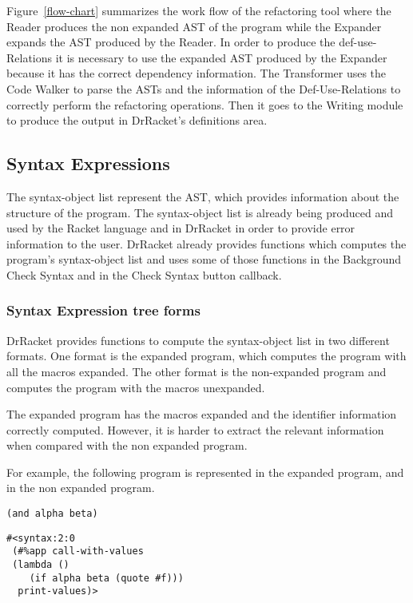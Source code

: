 Figure~\ref{flow-chart} summarizes the work flow of the refactoring tool where
the Reader produces the non expanded AST of the program while the Expander expands the
AST produced by the Reader.
In order to produce the def-use-Relations it is necessary to use the expanded AST produced by the
Expander because it has the correct dependency information.
The Transformer uses the Code Walker to parse the ASTs and the information of the Def-Use-Relations
to correctly perform the refactoring operations.
 Then it goes to the Writing module to produce the output in DrRacket's definitions area.


\subsection{Syntax Expressions}
The syntax-object list represent the AST, which provides information about
the structure of the program.
The syntax-object list is already being produced and used by the Racket language and
in DrRacket in order to provide error information to the user.
DrRacket already provides functions which computes the program's syntax-object list and uses some of those
functions in the Background Check Syntax and in the Check Syntax button callback.


\subsubsection{Syntax Expression tree forms}
DrRacket provides functions to compute the syntax-object list in two different formats.
One format is the expanded program, which computes the program with all the macros expanded.
The other format is the non-expanded program and computes the program with the macros
unexpanded.

The expanded program has the macros expanded and the identifier information correctly
computed.
However, it is harder to extract the relevant information when compared with the
non expanded program.


For example, the following program is represented in the expanded program,
and in the non expanded program.

\begin{lstlisting}[basicstyle=\ttfamily, caption=Original Code]
(and alpha beta)
\end{lstlisting}

\begin{lstlisting}[basicstyle=\ttfamily, caption=Expanded program]
#<syntax:2:0
 (#%app call-with-values
 (lambda ()
    (if alpha beta (quote #f)))
  print-values)>
\end{lstlisting}

